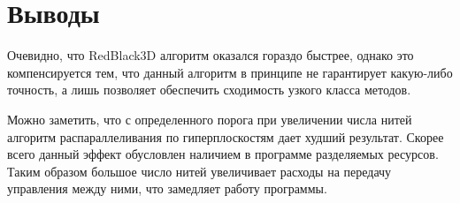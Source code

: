 \section{Выводы}
Очевидно, что RedBlack3D алгоритм оказался гораздо быстрее, однако это компенсируется тем, что данный алгоритм в принципе не гарантирует какую-либо точность, а лишь позволяет обеспечить сходимость узкого класса методов.

Можно заметить, что с определенного порога при увеличении числа нитей алгоритм распараллеливания по гиперплоскостям дает худший результат. Скорее всего данный эффект обусловлен наличием в программе разделяемых ресурсов. Таким образом большое число нитей увеличивает расходы на передачу управления между ними, что замедляет работу программы.

